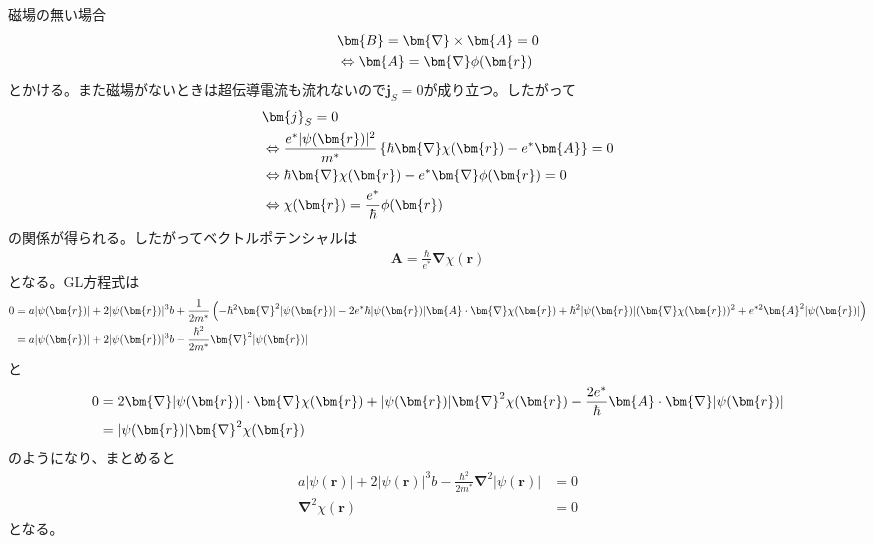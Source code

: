 \documentclass[dvipdfmx, 11pt, a4paper]{jsarticle}
\numberwithin{equation}{section}
\theoremstyle{definition}
\begin{document}
    \begin{derivationBox}
        磁場の無い場合
        \begin{align}
            &\bm{B} = \bm{\nabla} \times \bm{A} = 0 \notag \\
            &\Leftrightarrow \bm{A} = \bm{\nabla} \phi(\bm{r})
        \end{align}
        とかける。また磁場がないときは超伝導電流も流れないので$\bm{j}_S = 0$が成り立つ。したがって
        \begin{align}
            &\bm{j}_S = 0\notag \\
            &\Leftrightarrow \frac{e^*|\psi(\bm{r})|^2}{m^*}  \left\{ \hbar \bm{\nabla}\chi(\bm{r})  -e^*\bm{A} \right\} = 0 \notag \\
            &\Leftrightarrow \hbar \bm{\nabla}\chi(\bm{r})  -e^*\bm{\nabla}\phi(\bm{r}) = 0 \notag \\
            &\Leftrightarrow \chi(\bm{r}) = \frac{e^*}{\hbar} \phi(\bm{r})
        \end{align}
        の関係が得られる。したがってベクトルポテンシャルは
        \begin{align}
            \bm{A} = \frac{\hbar}{e^*} \bm{\nabla}\chi(\bm{r})
        \end{align}
        となる。GL方程式は
        \begin{align}
            0&=a|\psi(\bm{r})| + 2|\psi(\bm{r})|^3b + \frac{1}{2m^*}\left( -\hbar^2 \bm{\nabla}^2 |\psi(\bm{r})|-2e^*\hbar |\psi(\bm{r})| \bm{A}\cdot \bm{\nabla}\chi(\bm{r})   +\hbar^2|\psi(\bm{r})|(\bm{\nabla}\chi(\bm{r}))^2 +e^{*2}\bm{A}^2  |\psi(\bm{r})| \right) \notag \\
            &= a|\psi(\bm{r})| + 2|\psi(\bm{r})|^3b - \frac{\hbar^2}{2m^*}  \bm{\nabla}^2 |\psi(\bm{r})|
        \end{align}
        と
        \begin{align}
            0 &= 2 \bm{\nabla}|\psi(\bm{r})| \cdot \bm{\nabla}\chi(\bm{r})  + |\psi(\bm{r})| \bm{\nabla}^2 \chi(\bm{r}) -\frac{2e^*}{\hbar} \bm{A} \cdot \bm{\nabla}|\psi(\bm{r})| \notag \\
            &= |\psi(\bm{r})| \bm{\nabla}^2 \chi(\bm{r})
        \end{align}
        のようになり、まとめると
        \begin{align}
            a|\psi(\bm{r})| + 2|\psi(\bm{r})|^3b - \frac{\hbar^2}{2m^*}  \bm{\nabla}^2 |\psi(\bm{r})| &= 0 \\
            \bm{\nabla}^2 \chi(\bm{r}) &=  0
        \end{align}
        となる。
    \end{derivationBox}
\end{document}
